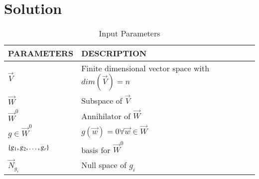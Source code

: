 \documentclass[journal,12pt,twocolumn]{IEEEtran}
\begin{document}
\section{Solution}
\begin{table}[!h]
\centering
\begin{tabular}{|p{3cm}|p{5cm}|}
\hline
\textbf{PARAMETERS}&\textbf{DESCRIPTION}\\
\hline
$\vec{V}$& Finite dimensional vector space with $dim(\vec{V})=n$\\
\hline
$\vec{W}$ & Subspace of $\vec{V}$\\
\hline
$\vec{W}^0$ & Annihilator of $\vec{W}$\\
\hline
$g \in \vec{W}^0$ & $g(\vec{w})=0 \forall \vec{w} \in \vec{W}$\\
\hline
$\left\{g_1,g_2,\hdots,g_r\right\}$& basis for $\vec{W}^0$\\
\hline
$\vec{N}_{g_i}$ & Null space of $g_i$\\
\hline
\end{tabular}
\caption{Input Parameters}
\end{table}
\end{document}
